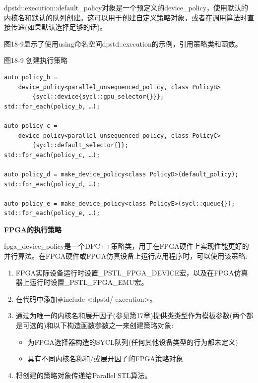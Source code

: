 dpstd::execution::default\_policy对象是一个预定义的device\_policy，使用默认的内核名和默认的队列创建。这可以用于创建自定义策略对象，或者在调用算法时直接传递(如果默认选择足够的话)。\par

图18-9显示了使用using命名空间dpstd::execution的示例，引用策略类和函数。\par

\hspace*{\fill} \par %
图18-9 创建执行策略
\begin{lstlisting}[caption={}]
auto policy_b = 
	device_policy<parallel_unsequenced_policy, class PolicyB> 
		{sycl::device{sycl::gpu_selector{}}};
std::for_each(policy_b, …);

auto policy_c = 
	device_policy<parallel_unsequenced_policy, class PolicyС> 
		{sycl::default_selector{}};
std::for_each(policy_c, …);

auto policy_d = make_device_policy<class PolicyD>(default_policy);
std::for_each(policy_d, …);

auto policy_e = make_device_policy<class PolicyE>(sycl::queue{});
std::for_each(policy_e, …);
\end{lstlisting}

\hspace*{\fill} \par %
\textbf{FPGA的执行策略}

fpga\_device\_policy是一个DPC++策略类，用于在FPGA硬件上实现性能更好的并行算法。在FPGA硬件或FPGA仿真设备上运行应用程序时，可以使用该策略:\par

\begin{enumerate}
	\item FPGA实际设备运行时设置\_PSTL\_FPGA\_DEVICE宏，以及在FPGA仿真器上运行时设置\_PSTL\_FPGA\_EMU宏。
	\item 在代码中添加\#include <dpstd/ execution>。
	\item 通过为唯一的内核名和展开因子(参见第17章)提供类类型作为模板参数(两个都是可选的)和以下构造函数参数之一来创建策略对象:
	\begin{itemize}
		\item 为FPGA选择器构造的SYCL队列(任何其他设备类型的行为都未定义)
		\item 具有不同内核名称和/或展开因子的FPGA策略对象
	\end{itemize}
	\item 将创建的策略对象传递给Parallel STL算法。
\end{enumerate}

